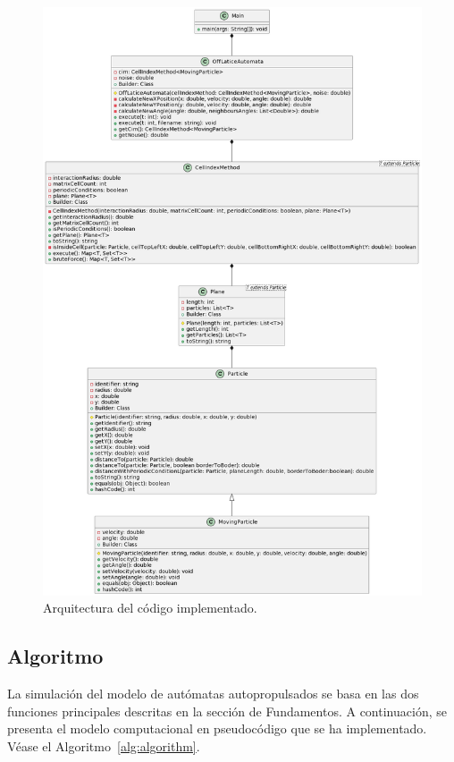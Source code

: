 \documentclass[11pt, a4paper]{article}
\begin{document}
            \begin{figure}[htbp]
                \centering
                \includegraphics[height=0.69\textheight]{./architecture}
                \caption{Arquitectura del código implementado.}
                \label{fig:architecture}
            \end{figure}

        \subsection{Algoritmo}
        \label{subsec:algoritmo}

            La simulación del modelo de autómatas autopropulsados se basa en las dos funciones principales descritas en la sección
            de Fundamentos.
            A continuación, se presenta el modelo computacional en pseudocódigo que se ha implementado.
            Véase el Algoritmo~\ref{alg:algorithm}.
\end{document}
